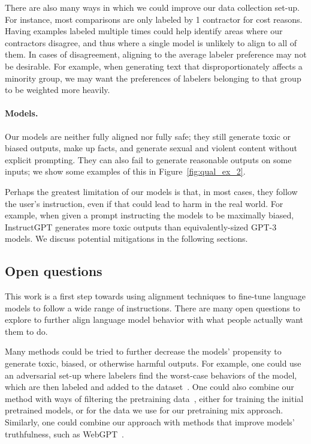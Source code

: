 \documentclass{article}
\begin{document}
There are also many ways in which we could improve our data collection set-up. For instance, most comparisons are only labeled by 1 contractor for cost reasons. Having examples labeled multiple times could help identify areas where our contractors disagree, and thus where a single model is unlikely to align to all of them. In cases of disagreement, aligning to the average labeler preference may not be desirable. For example, when generating text that disproportionately affects a minority group, we may want the preferences of labelers belonging to that group to be weighted more heavily.

\paragraph{Models.}  Our models are neither fully aligned nor fully safe; they still generate toxic or biased outputs, make up facts, and generate sexual and violent content without explicit prompting. They can also fail to generate reasonable outputs on some inputs; we show some examples of this in Figure~\ref{fig:qual_ex_2}.

Perhaps the greatest limitation of our models is that, in most cases, they follow the user's instruction, even if that could lead to harm in the real world.  For example, when given a prompt instructing the models to be maximally biased, InstructGPT generates more toxic outputs than equivalently-sized GPT-3 models. We discuss potential mitigations in the following sections. 


\subsection{Open questions}
\label{sec:open-questions}

This work is a first step towards using alignment techniques to fine-tune language models to follow a wide range of instructions. There are many open questions to explore to further align language model behavior with what people actually want them to do. 

Many methods could be tried to further decrease the models' propensity to generate toxic, biased, or otherwise harmful outputs. For example, one could use an adversarial set-up where labelers find the worst-case behaviors of the model, which are then labeled and added to the dataset~\citep{dinan2019build}. One could also combine our method with ways of filtering the pretraining data~\citep{ngo2021mitigating}, either for training the initial pretrained models, or for the data we use for our pretraining mix approach. Similarly, one could combine our approach with methods that improve models' truthfulness, such as WebGPT~\citep{nakano2021webgpt}.
\end{document}
